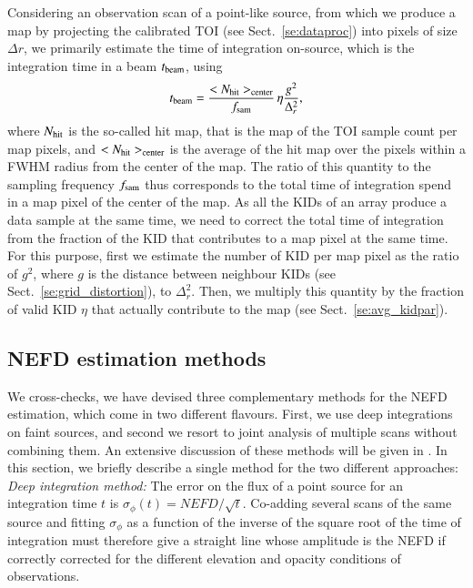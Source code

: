 Considering an observation scan of a point-like source, from which we
produce a map by projecting the calibrated TOI (see
Sect.~\ref{se:dataproc}) into pixels of size $\Delta r$, we primarily
estimate the time of integration on-source, which is the integration
time in a beam $t_{\rm{beam}}$, using
%
\begin{equation}
  t_{\rm{beam}} = \frac{<N_{\rm{hit}}>_{\rm{center}}}{f_{\rm{sam}}}\,
  \eta \frac{g^2}{\Delta_r^2},
\end{equation}
%
where $N_{\rm{hit}}$ is the so-called hit map, that is the map of the
TOI sample count per map pixels, and $<N_{\rm{hit}}>_{\rm{center}}$
is the average of the hit map over the pixels within a FWHM radius
from the center of the map. The ratio of this quantity to the sampling
frequency $f_{\rm{sam}}$ thus corresponds to the total time of integration
spend in a map pixel of the center of the map. As all the KIDs of an
array produce a data sample at the same time, we need to correct the
total time of integration from the fraction of the KID that
contributes to a map pixel at the same time. For this purpose, first
we estimate the number of KID per map pixel as the ratio of $g^2$,
where $g$ is the distance between neighbour KIDs (see
Sect.~\ref{se:grid_distortion}), to $\Delta_r^2$. Then, we multiply
this quantity by the fraction of valid KID $\eta$ that actually
contribute to the map (see Sect.~\ref{se:avg_kidpar}). 



\subsection{NEFD estimation methods}
\label{se:nefd_method}

We cross-checks, we have devised three complementary methods for the
NEFD estimation, which come in two different flavours. First, we
use deep integrations on faint sources, and second we resort to 
joint analysis of multiple scans without combining them. An
extensive discussion of these methods will be given in
\citet{Ponthieu2019}. In this section, we briefly describe a single method
for the two different approaches: \\

\noindent \emph{Deep integration method:} The error on the flux of a point source for an
integration time $t$ is $\sigma_\phi(t) = NEFD/\sqrt{t}$. Co-adding several scans of
the same source and fitting $\sigma_\phi$ as a function of the
inverse of the square root of the
time of integration must therefore give a straight line whose
amplitude is the NEFD if correctly corrected for the different
elevation and opacity conditions of observations.\\

